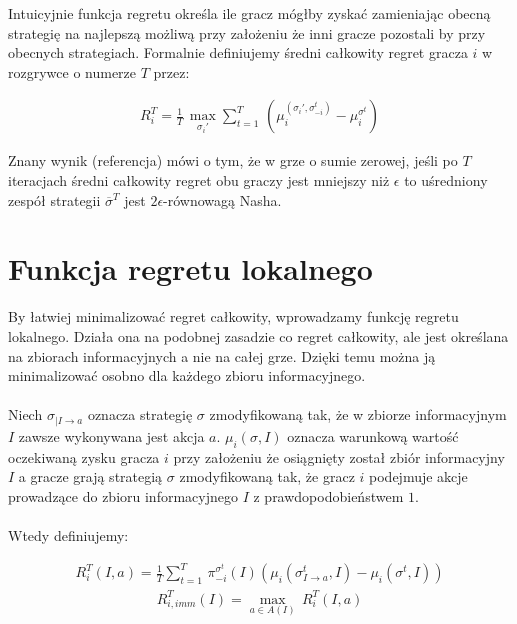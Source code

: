 \documentclass[licencjacka]{pracamgr}
\begin{document}
\noindent
Intuicyjnie funkcja regretu określa ile gracz mógłby zyskać zamieniając obecną strategię na najlepszą możliwą
przy założeniu że inni gracze pozostali by przy obecnych strategiach. Formalnie definiujemy średni całkowity regret gracza $i$
w rozgrywce o numerze $T$ przez:

\begin{align*}
R_i^T = \frac{1}{T} \, \max_{\sigma_i'} \sum\limits_{t=1}^T \, (\mu_i^{(\sigma_i', \sigma_{-i}^t)} - \mu_i^{\sigma^t})
\end{align*}

\noindent
Znany wynik (referencja) mówi o tym, że w grze o sumie zerowej, jeśli po $T$ iteracjach średni całkowity regret obu graczy
jest mniejszy niż $\epsilon$ to uśredniony zespół strategii $\overline{\sigma}^T$ jest $2\epsilon$-równowagą Nasha.

\section{Funkcja regretu lokalnego}

By łatwiej minimalizować regret całkowity, wprowadzamy funkcję regretu lokalnego.
Działa ona na podobnej zasadzie co regret całkowity, ale jest określana na zbiorach informacyjnych
a nie na całej grze. Dzięki temu można ją minimalizować osobno dla każdego zbioru informacyjnego. \\\\

\noindent
Niech $\sigma_{|I \rightarrow a}$ oznacza strategię $\sigma$ zmodyfikowaną tak, że w zbiorze informacyjnym $I$ zawsze
wykonywana jest akcja $a$. $\mu_i(\sigma, I)$ oznacza warunkową wartość oczekiwaną zysku gracza $i$ przy założeniu że
osiągnięty został zbiór informacyjny $I$ a gracze grają strategią $\sigma$ zmodyfikowaną tak, że gracz $i$
podejmuje akcje prowadzące do zbioru informacyjnego $I$ z prawdopodobieństwem $1$. \\\\

\noindent
Wtedy definiujemy:

\begin{align*}
R_i^T(I, a) = \frac{1}{T} \sum\limits_{t=1}^{T} \, \pi_{-i}^{\sigma^t}(I)(\mu_i(\sigma^t_{I \rightarrow a}, I) - \mu_i(\sigma^t, I))
\end{align*}
\begin{align*}
R_{i, imm}^T(I) = \max_{a \in A(I)} \, R_i^T(I, a)
\end{align*}
\end{document}
